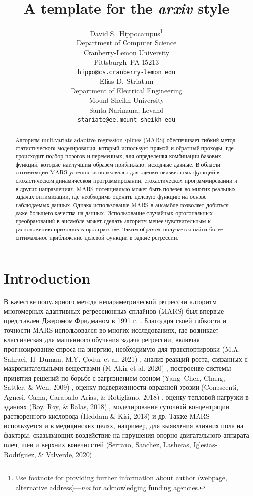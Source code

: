\documentclass{article}
\title{A template for the \emph{arxiv} style}
\author{ David S.~Hippocampus\thanks{Use footnote for providing further
		information about author (webpage, alternative
		address)---\emph{not} for acknowledging funding agencies.} \\
	Department of Computer Science\\
	Cranberry-Lemon University\\
	Pittsburgh, PA 15213 \\
	\texttt{hippo@cs.cranberry-lemon.edu} \\
	\And
	Elias D.~Striatum \\
	Department of Electrical Engineering\\
	Mount-Sheikh University\\
	Santa Narimana, Levand \\
	\texttt{stariate@ee.mount-sheikh.edu} \\
}
\date{}
\begin{document}
\maketitle

\begin{abstract}
Алгоритм multivariate adaptive regression splines (MARS) обеспечивает гибкий
метод статистического моделирования, который использует прямой и обратный проходы, где происходит подбор порогов и переменных, для определения комбинации
базовых функций, которые наилучшим образом приближают исходные данные.
В области оптимизации MARS успешно использовался для оценки неизвестных функций в стохастическом динамическом программировании, стохастическом программировании и в других направлениях. MARS потенциально может быть полезен во многих реальных задачах оптимизации, где необходимо оценить целевую функцию на основе наблюдаемых данных. Однако использование MARS в ансамбле позволяет добиться даже большего качества на данных. Использование случайных ортогональных преобразований в ансамбле может сделать алгоритм менее чувствительным к расположению признаков в пространстве. Таким образом, получается найти более оптимальное приближение целевой функции в задаче регрессии.
\end{abstract}



\section{Introduction}
В качестве популярного метода непараметрической регрессии алгоритм 
многомерных адаптивных регрессионных сплайнов (MARS) был впервые представлен Джеромом Фридманом в 1991 г. \cite{friedman1991multivariate}. Благодаря своей гибкости и точности MARS использовался во многих исследованиях, где возникает классическая для машинного обучения задача регрессии, включая прогнозирование спроса на энергию, необходимую для транспортировки (M.A. Sahraei, H. Duman, M.Y. Çodur et al, 2021) \cite{sahraei2021prediction}, анализ реакций роста, связанных с макропитательными веществами (M Akin et al, 2020) \cite{akin2020analysis}, построение системы принятия решений по борьбе с загрязнением озоном (Yang, Chen, Chang, Sattler, \& Wen, 2009) \cite{yang2009decision}, оценку подверженности овражной эрозии (Conoscenti, Agnesi, Cama, Caraballo-Arias, \& Rotigliano, 2018) \cite{conoscenti2018assessment}, оценку тепловой нагрузки в зданиях (Roy, Roy, \& Balas, 2018) \cite{roy2018estimating}, моделирование суточной концентрации растворенного кислорода (Heddam \& Kisi, 2018) \cite{heddam2018modelling} и др.
Также MARS используется и в медицинских целях, например, для выявления влияния пола на факторы, оказывающих воздействие на нарушения опорно-двигательного аппарата плеч, шеи и верхних конечностей
(Serrano, Sanchez, Lasheras, Iglesias-Rodríguez, \& Valverde, 2020) \cite{serrano2020identification}.
\end{document}

